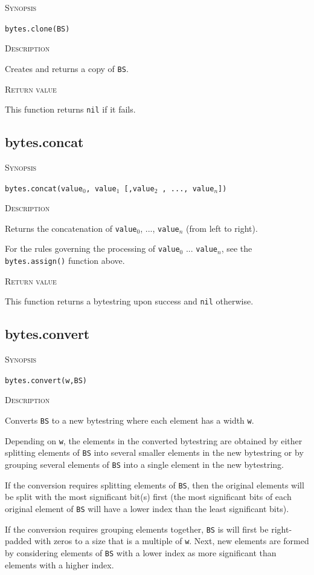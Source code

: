 \documentclass[11pt]{report}
\newcommand{\mansection}[1]{\vspace{0.5em}\par\noindent\textsc{#1}\vspace{0.5em}\par}
\newcommand{\syn}[1]{\texttt{#1}}
\begin{document}
\mansection{Synopsis}
\syn{bytes.clone(BS)}

\mansection{Description}
  Creates and returns a copy of \syn{BS}.

\mansection{Return value}
  This function returns \syn{nil} if it fails.

\subsection{bytes.concat}

\mansection{Synopsis}
\syn{bytes.concat(\syn{value$_0$}, \syn{value$_1$} [,\syn{value$_2$} , ..., \syn{value$_n$}])}

\mansection{Description}
  Returns the concatenation of \syn{value$_0$}, ..., \syn{value$_n$} (from left to right).

  For the rules governing the processing of \syn{value$_0$} ... \syn{value$_n$}, see
  the \syn{bytes.assign()} function above.

\mansection{Return value}
  This function returns a bytestring upon success and \syn{nil} otherwise.

\subsection{bytes.convert}

\mansection{Synopsis}
\syn{bytes.convert(w,BS)}

\mansection{Description}
  Converts \syn{BS} to a new bytestring where each element has a width \syn{w}.

  Depending on \syn{w}, the elements in the converted bytestring are obtained by either 
  splitting elements of \syn{BS} into several smaller elements in the new bytestring or 
  by grouping several elements of \syn{BS} into a single element in the new bytestring.

  If the conversion requires splitting elements of \syn{BS}, then the original elements will
  be split with the most significant bit(s) first (the most significant bits of each 
  original element of \syn{BS} will have a lower index than the least significant bits). 

  If the conversion requires grouping elements together, \syn{BS} is will first be 
  right-padded with zeros to a size that is a multiple of \syn{w}. Next, new 
  elements are formed by considering elements of \syn{BS} with a lower index as more 
  significant than elements with a higher index.
\end{document}
